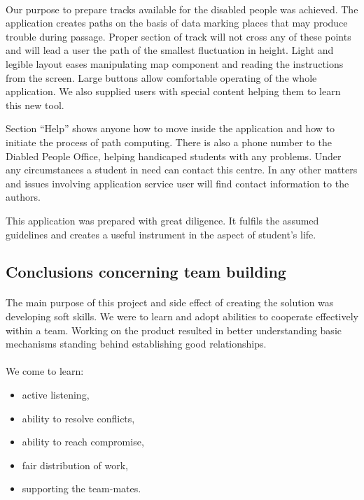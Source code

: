 \documentclass[12pt]{article}
\begin{document}
\paragraph{}
Our purpose to prepare tracks available for the disabled people was achieved.
The application creates paths on the basis of data marking places that may produce trouble during passage.
Proper section of track will not cross any of these points and will lead a user the path of the smallest fluctuation in height.
Light and legible layout eases manipulating map component and reading the instructions from the screen.
Large buttons allow comfortable operating of the whole application.
We also supplied users with special content helping them to learn this new tool.

Section ``Help'' shows anyone how to move inside the application and how to initiate the process of path computing.
There is also a phone number to the Diabled People Office, helping handicaped students with any problems.
Under any circumstances a student in need can contact this centre.
In any other matters and issues involving application service user will find contact information to the authors.

This application was prepared with great diligence.
It fulfils the assumed guidelines and creates a useful instrument in the aspect of student's life.

\subsection{Conclusions concerning team building}
\paragraph{}
The main purpose of this project and side effect of creating the solution was developing soft skills.
We were to learn and adopt abilities to cooperate effectively within a team.
Working on the product resulted in better understanding basic mechanisms standing behind establishing good relationships.

\paragraph{}
We come to learn:
\begin{itemize}
	\item active listening,
	\item ability to resolve conflicts,
	\item ability to reach compromise,
	\item fair distribution of work,
	\item supporting the team-mates.
\end{itemize}
\end{document}
